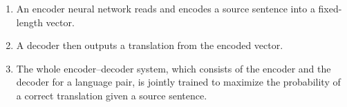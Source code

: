 \begin{enumerate}
    \item An encoder neural network reads and encodes a source sentence into a fixed-length vector.
    \hfill \cite{adv-ml-tech/paper/arxiv.org/1409.0473}
    
    \item A decoder then outputs a translation from the encoded vector. 
    \hfill \cite{adv-ml-tech/paper/arxiv.org/1409.0473}

    \item The whole encoder–decoder system, which consists of the encoder and the decoder for a language pair, is jointly trained to maximize the probability of a correct translation given a source sentence.
    \hfill \cite{adv-ml-tech/paper/arxiv.org/1409.0473}
\end{enumerate}





